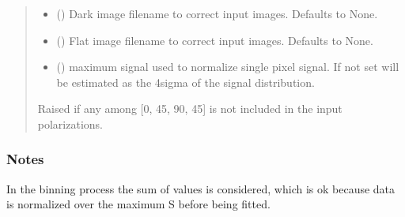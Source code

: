 \documentclass[letterpaper,10pt,english]{sphinxmanual}
\begin{document}
\begin{fulllineitems}
\begin{quote}
\begin{description}
\begin{itemize}
\item {} 
\sphinxAtStartPar
{} (\sphinxstyleliteralemphasis{\sphinxupquote{, }}) \textendash{} Dark image filename to correct input images. Defaults to None.

\item {} 
\sphinxAtStartPar
{} (\sphinxstyleliteralemphasis{\sphinxupquote{, }}) \textendash{} Flat image filename to correct input images. Defaults to None.

\item {} 
\sphinxAtStartPar
{} (\sphinxstyleliteralemphasis{\sphinxupquote{, }}) \textendash{} maximum signal used to normalize single pixel signal. If not set will be estimated as the 4sigma of the signal distribution.

\end{itemize}

\sphinxAtStartPar
{} \textendash{} Raised if any among {[}0, 45, 90, \sphinxhyphen{}45{]} is not included in the input polarizations.

\end{description}\end{quote}
\subsubsection*{Notes}

\sphinxAtStartPar
In the binning process the sum of values is considered, which is ok because data is normalized over the maximum S before being fitted.

\end{fulllineitems}

\end{document}
